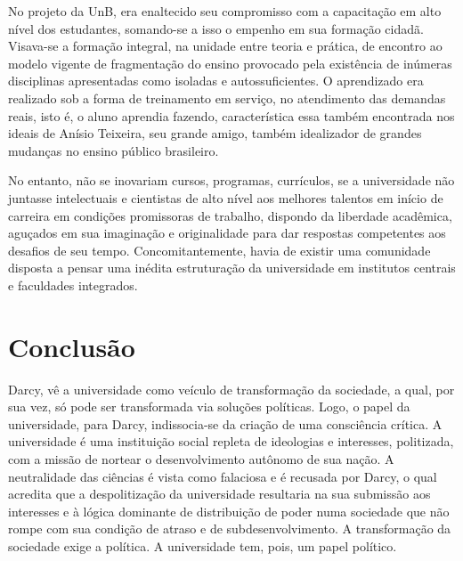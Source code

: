 \documentclass{sbrt}
\begin{document}
No projeto da UnB, era enaltecido seu compromisso com a capacitação em alto nível dos estudantes, somando-se a isso o empenho em sua formação cidadã. Visava-se a formação integral, na unidade entre teoria e prática, de encontro ao modelo vigente de fragmentação do ensino provocado pela existência de inúmeras disciplinas apresentadas como isoladas e autossuficientes. O aprendizado era realizado sob a forma de treinamento em serviço, no atendimento das demandas reais, isto é, o aluno aprendia fazendo, característica essa também encontrada nos ideais de Anísio Teixeira, seu grande amigo, também idealizador de grandes mudanças no ensino público brasileiro.

No entanto, não se inovariam cursos, programas, currículos, se a universidade não juntasse intelectuais e cientistas de alto nível aos melhores talentos em início de carreira em condições promissoras de trabalho, dispondo da liberdade acadêmica, aguçados em sua imaginação e originalidade para dar respostas competentes aos desafios de seu tempo. Concomitantemente, havia de existir uma comunidade disposta a pensar uma inédita estruturação da universidade em institutos centrais e faculdades integrados.


\section{Conclusão}

Darcy, vê a universidade como veículo de transformação da sociedade, a qual, por sua vez, só pode ser transformada via soluções políticas. Logo, o papel da universidade, para Darcy, indissocia-se da criação de uma consciência crítica. A universidade é uma instituição social repleta de ideologias e interesses, politizada, com a missão de nortear o desenvolvimento autônomo de sua nação. A neutralidade das ciências é vista como falaciosa e é recusada por Darcy, o qual acredita que a despolitização da universidade resultaria na sua submissão aos interesses e à lógica dominante de distribuição de poder numa sociedade que não rompe com sua condição de atraso e de subdesenvolvimento. A transformação da sociedade exige a política. A universidade tem, pois, um papel político.
\end{document}
